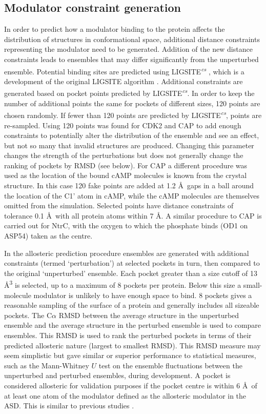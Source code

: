 \subsection{Modulator constraint generation}

In order to predict how a modulator binding to the protein affects the distribution of structures in conformational space, additional distance constraints representing the modulator need to be generated.
Addition of the new distance constraints leads to ensembles that may differ significantly from the unperturbed ensemble.
Potential binding sites are predicted using LIGSITE\textsuperscript{\it cs} \cite{Huang2006}, which is a development of the original LIGSITE algorithm \cite{Hendlich1997}.
Additional constraints are generated based on pocket points predicted by LIGSITE\textsuperscript{\it cs}.
In order to keep the number of additional points the same for pockets of different sizes, 120 points are chosen randomly.
If fewer than 120 points are predicted by LIGSITE\textsuperscript{\it cs}, points are re-sampled.
Using 120 points was found for CDK2 and CAP to add enough constraints to potentially alter the distribution of the ensemble and see an effect, but not so many that invalid structures are produced.
Changing this parameter changes the strength of the perturbations but does not generally change the ranking of pockets by RMSD (see below).
For CAP a different procedure was used as the location of the bound cAMP molecules is known from the crystal structure.
In this case 120 fake points are added at 1.2 \AA\ gaps in a ball around the location of the C1' atom in cAMP, while the cAMP molecules are themselves omitted from the simulation.
Selected points have distance constraints of tolerance 0.1 \AA\ with all protein atoms within 7 \AA.
A similar procedure to CAP is carried out for NtrC, with the oxygen to which the phosphate binds (OD1 on ASP54) taken as the centre.

In the allosteric prediction procedure ensembles are generated with additional constraints (termed `perturbation') at selected pockets in turn, then compared to the original `unperturbed' ensemble.
Each pocket greater than a size cutoff of 13 \AA\textsuperscript{3} is selected, up to a maximum of 8 pockets per protein.
Below this size a small-molecule modulator is unlikely to have enough space to bind.
8 pockets gives a reasonable sampling of the surface of a protein and generally includes all sizeable pockets.
The C$\alpha$ RMSD between the average structure in the unperturbed ensemble and the average structure in the perturbed ensemble is used to compare ensembles.
This RMSD is used to rank the perturbed pockets in terms of their predicted allosteric nature (largest to smallest RMSD).
This RMSD measure may seem simplistic but gave similar or superior performance to statistical measures, such as the Mann-Whitney $U$ test on the ensemble fluctuations between the unperturbed and perturbed ensembles, during development.
A pocket is considered allosteric for validation purposes if the pocket centre is within 6 \AA\ of at least one atom of the modulator defined as the allosteric modulator in the ASD.
This is similar to previous studies \cite{Panjkovich2012}.


